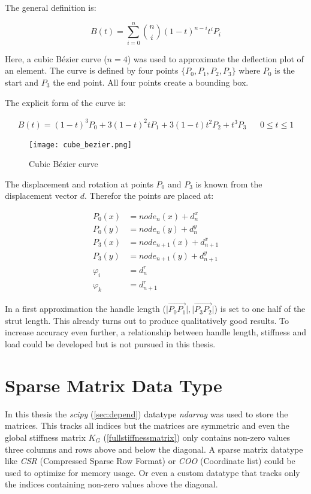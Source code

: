 The general definition is:

\begin{equation} \label{generalBezier}
B(t) = \sum\limits_{i=0}^n \binom{n}{i} (1-t)^{n-i} t^{i} P_i
\end{equation}

Here, a cubic B\'{e}zier curve ($n=4$) was used to approximate the deflection plot of an element. The curve is defined by four points $\{P_0, P_1, P_2, P_3\}$ where $P_0$ is the start and $P_3$ the end point. All four points create a bounding box.

The explicit form of the curve is:

\begin{align*} \label{cubeBezier}
B(t) = (1-t)^3 P_0 + 3 (1-t)^2 t P_1 + 3 (1-t) t^2 P_2 + t^3 P_3 && 0 \leq t \leq 1
\end{align*}

\begin{figure}[h]%
    \centering
    \texttt{[image: cube\_bezier.png]}%
    \caption{Cubic B\'{e}zier curve}%
    \label{fig:cubeBezier}%
\end{figure}

The displacement and rotation at points $P_0$ and $P_3$ is known from the displacement vector $d$. Therefor the points are placed at:

\begin{equation*} \label{bezierHandles}
\begin{aligned}
P_0(x) &= node_n(x) + d_n^x \\
P_0(y) &= node_n(y) + d_n^y \\
P_3(x) &= node_{n+1}(x) + d_{n+1}^x \\
P_3(y) &= node_{n+1}(y) + d_{n+1}^y \\
\varphi_i &= d_n^r \\
\varphi_k &= d_{n+1}^r
\end{aligned}
\end{equation*}

In a first approximation the handle length ($\lvert\overrightarrow{P_0P_1}\lvert , \lvert\overrightarrow{P_3P_2}\lvert$) is set to one half of the strut length. This already turns out to produce qualitatively good results.
To increase accuracy even further, a relationship between handle length, stiffness and load could be developed but is not pursued in this thesis. 

\section{Sparse Matrix Data Type}
\label{sec:sparsematrix}

In this thesis the \textit{scipy} (\cref{sec:depend}) datatype \textit{ndarray} was used to store the matrices. This tracks all indices but the matrices are symmetric and even the global stiffness matrix $K_G$ (\cref{fullstiffnessmatrix}) only contains non-zero values three columns and rows above and below the diagonal.
A sparse matrix datatype like \textit{CSR} (Compressed Sparse Row Format) or \textit{COO} (Coordinate list) could be used to optimize for memory usage.
Or even a custom datatype that tracks only the indices containing non-zero values above the diagonal.
